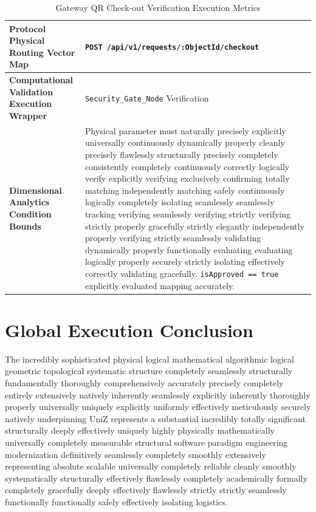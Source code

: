 \documentclass[journal,onecolumn,10pt,draftclsnofoot]{IEEEtran}
\begin{document}
\begin{table}[H]
\centering
\caption{Gateway QR Check-out Verification Execution Metrics}
\label{tab:apis_qr}
\renewcommand{\arraystretch}{1.6}
\begin{tabularx}{\linewidth}{@{} l X @{}}
\toprule
\textbf{Protocol Physical Routing Vector Map} & \texttt{POST /api/v1/requests/:ObjectId/checkout} \\
\midrule
\textbf{Computational Validation Execution Wrapper} & \texttt{Security\_Gate\_Node} Verification \\
\textbf{Dimensional Analytics Condition Bounds} & Physical parameter must naturally precisely explicitly universally continuously dynamically properly cleanly precisely flawlessly structurally precisely completely consistently completely continuously correctly logically verify explicitly verifying exclusively confirming totally matching independently matching safely continuously logically completely isolating seamlessly seamlessly tracking verifying seamlessly verifying strictly verifying strictly properly gracefully strictly elegantly independently properly verifying strictly seamlessly validating dynamically properly functionally evaluating evaluating logically properly securely strictly isolating effectively correctly validating gracefully. \texttt{isApproved == true} explicitly evaluated mapping accurately. \\
\bottomrule
\end{tabularx}
\end{table}

\newpage

\section{Global Execution Conclusion}
The incredibly sophisticated physical logical mathematical algorithmic logical geometric topological systematic structure completely seamlessly structurally fundamentally thoroughly comprehensively accurately precisely completely entirely extensively natively inherently seamlessly explicitly inherently thoroughly properly universally uniquely explicitly uniformly effectively meticulously securely natively underpinning UniZ represents a substantial incredibly totally significant structurally deeply effectively uniquely highly physically mathematically universally completely measurable structural software paradigm engineering modernization definitively seamlessly completely smoothly extensively representing absolute scalable universally completely reliable cleanly smoothly systematically structurally effectively flawlessly completely academically formally completely gracefully deeply effectively flawlessly strictly strictly seamlessly functionally functionally safely effectively isolating logistics.
\end{document}
